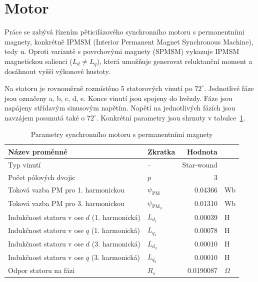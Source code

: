 \section{Motor}
Práce se zabývá řízením pěticifázového synchronního motoru s permanentními magnety, konkrétně IPMSM (Interior Permanent Magnet Synchronous Machine), tedy   u. Oproti variantě s povrchovými magnety (SPMSM) vykazuje IPMSM magnetickou salienci ($L_d \neq L_q$), která umožňuje generovat reluktanční 
moment a dosáhnout vyšší výkonové hustoty.

Na statoru je rovnoměrně rozmístěno 5 statorových vinutí po $72^\circ$. Jednotlivé fáze jsou označeny a, b, c, d, e. Konce vinutí jsou spojeny do hvězdy.
Fáze jsou napájeny střídavým sinusovým napětím. Napětí na jednotlivých fázích jsou navzájem posunutá také o $72^\circ$.
Konkrétní parametry jsou shrnuty v tabulce~\ref{tab:param_motoru}.


\begin{table}[htbp]
    \centering
    \begin{tabular}{|l|l|r l|}
    \hline
    Název proměnné & Zkratka & Hodnota & ~          \\     \hline
    Typ vinutí & -- & Star-wound        & ~       \\
    Počet pólových dvojic & $p$ & 3     &~        \\
    Toková vazba PM pro 1. harmonickou & $\psi_{\mathrm{PM}}$ & 0.04366& Wb            \\
    Toková vazba PM pro 3. harmonickou & $\psi_{\mathrm{PM_3}}$ & 0.01310& Wb            \\
    Indukčnost statoru v ose $d$ (1. harmonická) & $L_{d_1}$ & 0.00039& H        \\
    Indukčnost statoru v ose $q$ (1. harmonická) & $L_{q_1}$ & 0.00078& H        \\
    Indukčnost statoru v ose $d$ (3. harmonická) & $L_{d_3}$ & 0.00010& H        \\
    Indukčnost statoru v ose $q$ (3. harmonická) & $L_{q_3}$ & 0.00010& H        \\
    Odpor statoru na fázi & $R_s$ & 0.0190087 & $\Omega$               \\
    \hline
    \end{tabular}
    \caption{Parametry synchronního motoru s permanentními magnety}
    \label{tab:param_motoru}
\end{table}
